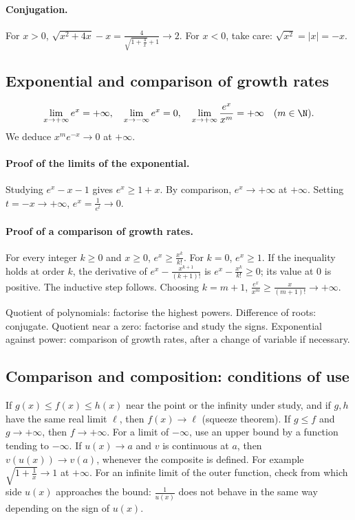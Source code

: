 \paragraph{Conjugation.} For $x>0$, $\sqrt{x^2+4x}-x=\frac{4}{\sqrt{1+\frac{4}{x}}+1}\to2$. For $x<0$, take care: $\sqrt{x^2}=|x|=-x$.
\subsection{Exponential and comparison of growth rates}
\[\lim_{x\to+\infty}e^x=+\infty,\quad\lim_{x\to-\infty}e^x=0,\quad
\lim_{x\to+\infty}\frac{e^x}{x^m}=+\infty\quad(m\in\N).\]
We deduce $x^me^{-x}\to0$ at $+\infty$.
\paragraph{Proof of the limits of the exponential.} Studying $e^x-x-1$ gives $e^x\ge1+x$. By comparison, $e^x\to+\infty$ at $+\infty$. Setting $t=-x\to+\infty$, $e^x=\frac{1}{e^t}\to0$.
\paragraph{Proof of a comparison of growth rates.} For every integer $k\ge0$ and $x\ge0$, $e^x\ge \frac{x^k}{k!}$. For $k=0$, $e^x\ge1$. If the inequality holds at order $k$, the derivative of $e^x-\frac{x^{k+1}}{(k+1)!}$ is $e^x-\frac{x^k}{k!}\ge0$; its value at $0$ is positive. The inductive step follows. Choosing $k=m+1$, $\frac{e^x}{x^m}\ge \frac{x}{(m+1)!}\to+\infty$.
\begin{method}
Quotient of polynomials: factorise the highest powers. Difference of roots: conjugate. Quotient near a zero: factorise and study the signs. Exponential against power: comparison of growth rates, after a change of variable if necessary.
\end{method}
\subsection{Comparison and composition: conditions of use}
If $g(x)\le f(x)\le h(x)$ near the point or the infinity under study, and if $g,h$ have the same real limit $\ell$, then $f(x)\to\ell$ (squeeze theorem). If $g\le f$ and $g\to+\infty$, then $f\to+\infty$. For a limit of $-\infty$, use an upper bound by a function tending to $-\infty$.
If $u(x)\to a$ and $v$ is continuous at $a$, then $v(u(x))\to v(a)$, whenever the composite is defined. For example $\sqrt{1+\frac{1}{x}}\to1$ at $+\infty$. For an infinite limit of the outer function, check from which side $u(x)$ approaches the bound: $\frac{1}{u(x)}$ does not behave in the same way depending on the sign of $u(x)$.


